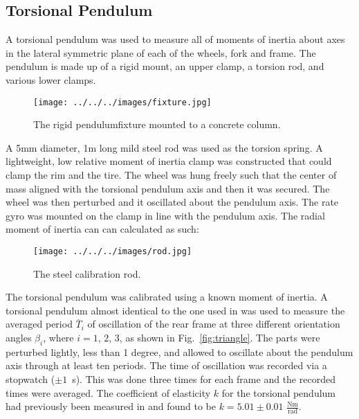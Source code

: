 \documentclass{bmd2010p}
\begin{document}
\subsection{Torsional Pendulum}
A torsional pendulum was used to measure all of moments of inertia about axes
in the lateral symmetric plane of each of the wheels, fork and frame. The
pendulum is made up of a rigid mount, an upper clamp, a torsion rod, and
various lower clamps.
\begin{figure}[htbp]
    \begin{center}
        \texttt{[image: ../../../images/fixture.jpg]}
    \end{center}
    \caption{The rigid pendulumfixture mounted to a concrete column.}
    \label{fig:fixture}
\end{figure}
A 5mm diameter, 1m long mild steel rod was used as the torsion
spring. A lightweight, low relative moment of inertia clamp was constructed
that could clamp the rim and the tire. The wheel was hung freely such that the
center of mass aligned with the torsional pendulum axis and then it was
secured. The wheel was then perturbed and it oscillated about the pendulum axis.
The rate gyro was mounted on the clamp in line with the pendulum axis. The
radial moment of inertia can can calculated as such:
\begin{figure}[tbp]
    \begin{center}
        \texttt{[image: ../../../images/rod.jpg]}
    \end{center}
    \caption{The steel calibration rod.}
    \label{fig:rod}
\end{figure}
The torsional pendulum was calibrated using a known moment of inertia.
A torsional pendulum almost identical to the one used in
\cite{Kooijman2006} was used to measure the averaged period $\overline{T}_i$ of
oscillation of the rear frame at three different
orientation angles $\beta_i$, where $i=1$, $2$, $3$, as shown in
Fig.~\ref{fig:triangle}. The parts were perturbed lightly, less than 1 degree,
and allowed to oscillate about the pendulum axis through at least ten periods.
The time of oscillation was recorded via a stopwatch ($\pm1$~s). This was done
three times for each frame and the recorded times were averaged. The
coefficient of elasticity $k$ for the torsional pendulum had previously been
measured in \cite{Kooijman2006} and found to be $k=5.01\pm0.01$
$\frac{\textrm{Nm}}{\textrm{rad}}$.
\end{document}
